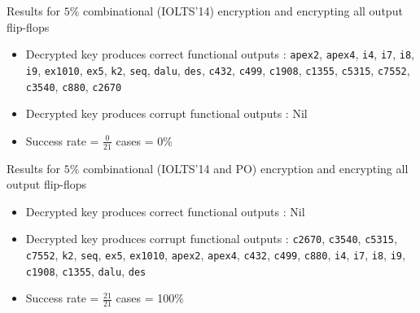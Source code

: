 \begin{frame}{Results for $5\%$ combinational (IOLTS'14) encryption and encrypting all output flip-flops}
\begin{itemize}
\item Decrypted key produces correct functional outputs : \texttt{apex2}, \texttt{apex4}, \texttt{i4}, \texttt{i7}, \texttt{i8}, \texttt{i9}, \texttt{ex1010}, \texttt{ex5}, \texttt{k2}, \texttt{seq}, \texttt{dalu}, \texttt{des}, \texttt{c432}, \texttt{c499}, \texttt{c1908}, \texttt{c1355}, \texttt{c5315}, \texttt{c7552}, \texttt{c3540}, \texttt{c880}, \texttt{c2670}
\item Decrypted key produces corrupt functional outputs : \alert{Nil}
\item Success rate = $\frac{0}{21}$ cases = \alert{0\%}
\end{itemize}
\end{frame}

\begin{frame}{Results for $5\%$ combinational (IOLTS'14 and PO) encryption and encrypting all output flip-flops}
\begin{itemize}
\item Decrypted key produces correct functional outputs :  \alert{Nil}  
\item Decrypted key produces corrupt functional outputs :  \texttt{c2670}, \texttt{c3540}, \texttt{c5315}, \texttt{c7552}, \texttt{k2}, \texttt{seq}, \texttt{ex5}, \texttt{ex1010},  \texttt{apex2}, \texttt{apex4}, \texttt{c432}, \texttt{c499}, \texttt{c880}, \texttt{i4},  \texttt{i7}, \texttt{i8},  \texttt{i9},  \texttt{c1908}, \texttt{c1355}, \texttt{dalu}, \texttt{des}
\item Success rate = $\frac{21}{21}$ cases = \alert{100\%}
\end{itemize}
\end{frame}


